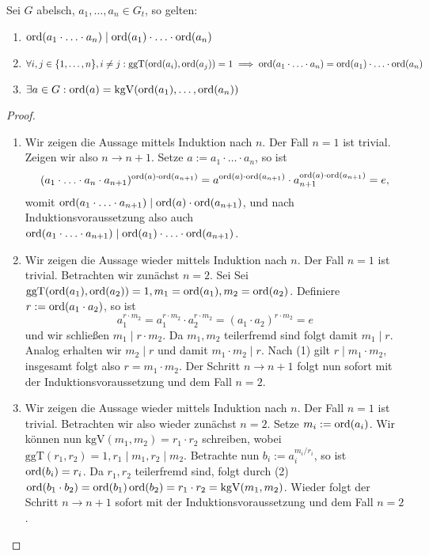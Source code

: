 \begin{lemma} \label{lemma:abelsch-torsion-lemma}
    Sei $G$ abelsch, $a_1, \hdots, a_n \in G_t$, so gelten:
    \begin{enumerate}
        \item $ \operatorname{ord}(a_1 \cdot \hdots \cdot a_n) \mid \operatorname{ord}(a_1) \cdot \hdots \cdot \operatorname{ord}(a_n) $
        \item $ \forall i, j \in \{ 1, \hdots, n \}, i \neq j: \mathrm{ggT}(\operatorname{ord}(a_i), \operatorname{ord}(a_j)) = 1 \implies \operatorname{ord}(a_1 \cdot \hdots \cdot a_n) = \operatorname{ord}(a_1) \cdot \hdots \cdot \operatorname{ord}(a_n) $
        \item $ \exists a \in G: \operatorname{ord}(a) = \mathrm{kgV}(\operatorname{ord}(a_1), \hdots, \operatorname{ord}(a_n)) $
    \end{enumerate}
\end{lemma}

\begin{proof}{\ }
    \begin{enumerate}
        \item Wir zeigen die Aussage mittels Induktion nach $n$. Der Fall $n=1$ ist trivial. Zeigen wir also $n \to n + 1$. Setze $a := a_1 \cdot \hdots \cdot a_n$, so ist
        $$ (a_1 \cdot \hdots \cdot a_n \cdot a_{n+1})^{\operatorname{ord}(a) \cdot \operatorname{ord}(a_{n+1})} = a^{\operatorname{ord}(a) \cdot \operatorname{ord}(a_{n+1})} \cdot a_{n+1}^{\operatorname{ord}(a) \cdot \operatorname{ord}(a_{n+1})} = e, $$
        womit $\operatorname{ord}(a_1 \cdot \hdots \cdot a_{n+1}) \mid \operatorname{ord}(a) \cdot \operatorname{ord}(a_{n+1})$, und nach Induktionsvoraussetzung also auch $\operatorname{ord}(a_1 \cdot \hdots \cdot a_{n+1}) \mid \operatorname{ord}(a_1) \cdot \hdots \cdot \operatorname{ord}(a_{n+1})$.

        \item Wir zeigen die Aussage wieder mittels Induktion nach $n$. Der Fall $n=1$ ist trivial. Betrachten wir zunächst $n=2$. Sei Sei $\mathrm{ggT}(\operatorname{ord}(a_1), \operatorname{ord}(a_2)) = 1, m_1 = \operatorname{ord}(a_1), m_2 = \operatorname{ord}(a_2)$. Definiere $r := \operatorname{ord}(a_1 \cdot a_2)$, so ist
        $$ a_1^{r \cdot m_2} = a_1^{r \cdot m_2} \cdot a_2^{r \cdot m_2} = (a_1 \cdot a_2)^{r \cdot m_2} = e $$
        und wir schließen $m_1 \mid r \cdot m_2$. Da $m_1, m_2$ teilerfremd sind folgt damit $m_1 \mid r$. Analog erhalten wir $m_2 \mid r$ und damit $m_1 \cdot m_2 \mid r$. Nach (1) gilt $r \mid m_1 \cdot m_2$, insgesamt folgt also $r = m_1 \cdot m_2$. Der Schritt $n \to n+1$ folgt nun sofort mit der Induktionsvoraussetzung und dem Fall $n=2$.

        \item Wir zeigen die Aussage wieder mittels Induktion nach $n$. Der Fall $n=1$ ist trivial. Betrachten wir also wieder zunächst $n=2$. Setze $m_i := \operatorname{ord}(a_i)$. Wir können nun $\mathrm{kgV}(m_1, m_2) = r_1 \cdot r_2$ schreiben, wobei $\mathrm{ggT}(r_1, r_2) = 1, r_1 \mid m_1, r_2 \mid m_2$. Betrachte nun $b_i := a_i^{m_i / r_i}$, so ist $\operatorname{ord}(b_i) = r_i$. Da $r_1, r_2$ teilerfremd sind, folgt durch (2) $\operatorname{ord}(b_1 \cdot b_2) = \operatorname{ord}(b_1) \operatorname{ord}(b_2) = r_1 \cdot r_2 = \mathrm{kgV}(m_1, m_2)$. Wieder folgt der Schritt $n \to n+1$ sofort mit der Induktionsvoraussetzung und dem Fall $n=2$. 
    \end{enumerate}
\end{proof}

